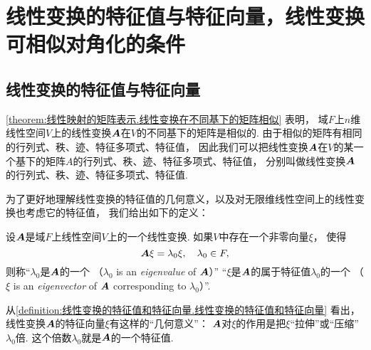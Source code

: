 \section{线性变换的特征值与特征向量，线性变换可相似对角化的条件}
\subsection{线性变换的特征值与特征向量}
\cref{theorem:线性映射的矩阵表示.线性变换在不同基下的矩阵相似} 表明，
域\(F\)上\(n\)维线性空间\(V\)上的线性变换\(\boldsymbol{A}\)在\(V\)的不同基下的矩阵是相似的.
由于相似的矩阵有相同的行列式、秩、迹、特征多项式、特征值，
因此我们可以把线性变换\(\boldsymbol{A}\)在\(V\)的某一个基下的矩阵\(A\)的行列式、秩、迹、特征多项式、特征值，
分别叫做线性变换\(\boldsymbol{A}\)的行列式、秩、迹、特征多项式、特征值.

为了更好地理解线性变换的特征值的几何意义，以及对无限维线性空间上的线性变换也考虑它的特征值，
我们给出如下的定义：
\begin{definition}\label{definition:线性变换的特征值和特征向量.线性变换的特征值和特征向量}
设\(\boldsymbol{A}\)是域\(F\)上线性空间\(V\)上的一个线性变换.
如果\(V\)中存在一个非零向量\(\xi\)，
使得\begin{equation*}
	\boldsymbol{A}\xi=\lambda_0\xi,
	\quad \lambda_0\in F,
\end{equation*}
则称“\(\lambda_0\)是\(\boldsymbol{A}\)的一个%
（\(\lambda_0\) is an \emph{eigenvalue} of \(\boldsymbol{A}\)）”
“\(\xi\)是\(\boldsymbol{A}\)的属于特征值\(\lambda_0\)的一个%
（\(\xi\) is an \emph{eigenvector} of \(\boldsymbol{A}\) corresponding to \(\lambda_0\)）”.
\end{definition}
从\cref{definition:线性变换的特征值和特征向量.线性变换的特征值和特征向量} 看出，
线性变换\(\boldsymbol{A}\)的特征向量\(\xi\)有这样的“几何意义”：
\(\boldsymbol{A}\)对\(\xi\)的作用是把\(\xi\)“拉伸”或“压缩”\(\lambda_0\)倍.
这个倍数\(\lambda_0\)就是\(\boldsymbol{A}\)的一个特征值.

